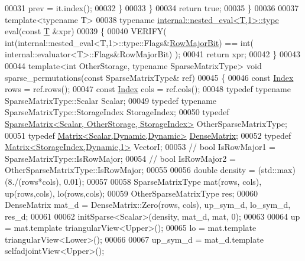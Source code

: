 \begin{DoxyCode}
00031       prev = it.index();
00032     \}
00033   \}
00034   \textcolor{keywordflow}{return} \textcolor{keyword}{true};
00035 \}
00036 
00037 \textcolor{keyword}{template}<\textcolor{keyword}{typename} T>
00038 \textcolor{keyword}{typename} \hyperlink{class_eigen_1_1internal_1_1_tensor_lazy_evaluator_writable}{internal::nested\_eval<T,1>::type} eval(\textcolor{keyword}{const} 
      \hyperlink{group___sparse_core___module}{T} &xpr)
00039 \{
00040   VERIFY( \textcolor{keywordtype}{int}(internal::nested\_eval<T,1>::type::Flags&\hyperlink{group__flags_gae4f56c2a60bbe4bd2e44c5b19cbe8762}{RowMajorBit}) == \textcolor{keywordtype}{int}(
      internal::evaluator<T>::Flags&RowMajorBit) );
00041   \textcolor{keywordflow}{return} xpr;
00042 \}
00043 
00044 \textcolor{keyword}{template}<\textcolor{keywordtype}{int} OtherStorage, \textcolor{keyword}{typename} SparseMatrixType> \textcolor{keywordtype}{void} sparse\_permutations(\textcolor{keyword}{const} SparseMatrixType& ref)
00045 \{
00046   \textcolor{keyword}{const} \hyperlink{namespace_eigen_a62e77e0933482dafde8fe197d9a2cfde}{Index} rows = ref.rows();
00047   \textcolor{keyword}{const} \hyperlink{namespace_eigen_a62e77e0933482dafde8fe197d9a2cfde}{Index} cols = ref.cols();
00048   \textcolor{keyword}{typedef} \textcolor{keyword}{typename} SparseMatrixType::Scalar Scalar;
00049   \textcolor{keyword}{typedef} \textcolor{keyword}{typename} SparseMatrixType::StorageIndex StorageIndex;
00050   \textcolor{keyword}{typedef} \hyperlink{group___sparse_core___module_class_eigen_1_1_sparse_matrix}{SparseMatrix<Scalar, OtherStorage, StorageIndex>} 
      OtherSparseMatrixType;
00051   \textcolor{keyword}{typedef} \hyperlink{group___core___module}{Matrix<Scalar,Dynamic,Dynamic>} 
      \hyperlink{group___core___module}{DenseMatrix};
00052   \textcolor{keyword}{typedef} \hyperlink{group___core___module}{Matrix<StorageIndex,Dynamic,1>} VectorI;
00053 \textcolor{comment}{//   bool IsRowMajor1 = SparseMatrixType::IsRowMajor;}
00054 \textcolor{comment}{//   bool IsRowMajor2 = OtherSparseMatrixType::IsRowMajor;}
00055   
00056   \textcolor{keywordtype}{double} density = (std::max)(8./(rows*cols), 0.01);
00057   
00058   SparseMatrixType mat(rows, cols), up(rows,cols), lo(rows,cols);
00059   OtherSparseMatrixType res;
00060   DenseMatrix mat\_d = DenseMatrix::Zero(rows, cols), up\_sym\_d, lo\_sym\_d, res\_d;
00061   
00062   initSparse<Scalar>(density, mat\_d, mat, 0);
00063 
00064   up = mat.template triangularView<Upper>();
00065   lo = mat.template triangularView<Lower>();
00066   
00067   up\_sym\_d = mat\_d.template selfadjointView<Upper>();

\end{DoxyCode}
